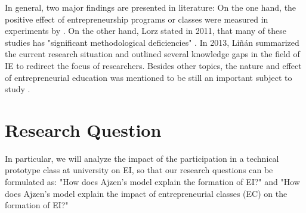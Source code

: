 In general, two major findings are presented in literature: On the one hand, the positive effect of entrepreneurship programs or classes were measured in experiments by .
On the other hand, Lorz stated in 2011, that many of these studies has "significant methodological deficiencies" \cite{lorz2011impact}.
In 2013, Li{\~n}{\'a}n summarized the current research situation and outlined several knowledge gaps in the field of IE to redirect the focus of researchers. Besides other topics, the nature and effect of entrepreneurial education was mentioned to be still an important subject to study \cite{linan2015systematic}. 



\section{Research Question}
In particular, we will analyze the impact of the participation in a technical prototype class at university on EI, so that our research questions can be formulated as: "How does Ajzen's model explain the formation of EI?" and "How does Ajzen's model explain the impact of entrepreneurial classes (EC) on the formation of EI?"
